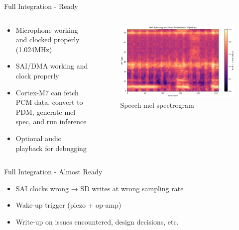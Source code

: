 \begin{frame}{Full Integration - Ready}
    \begin{columns}
        \begin{column}{0.45\textwidth}
            \begin{itemize}
                \item Microphone working and clocked properly (1.024MHz)
                \item SAI/DMA working and clock properly
                \item Cortex-M7 can fetch PCM data, convert to PDM, generate mel spec, and run inference
                \item Optional audio playback for debugging
            \end{itemize}
        \end{column}
        \begin{column}{0.55\textwidth}
            \begin{figure}
                \centering
                \includegraphics[height=1\textheight,width=1\textwidth,keepaspectratio]{images/mel_spec.png}
                \caption{Speech mel spectrogram}
            \end{figure}
        \end{column}
    \end{columns}
\end{frame}

\begin{frame}{Full Integration - Almost Ready}
    \begin{itemize}
        \item SAI clocks wrong → SD writes at wrong sampling rate 
        \item Wake-up trigger (piezo + op-amp)
        \item Write-up on issues encountered, design decisions, etc.
    \end{itemize}
\end{frame}


